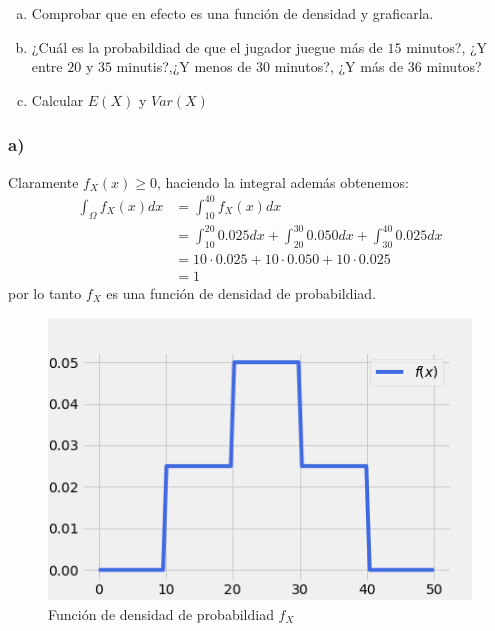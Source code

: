 \documentclass{article}
\begin{document}
\begin{enumerate}[a)]
    \item Comprobar que en efecto es una función de densidad y graficarla.
    \item ¿Cuál es la probabildiad de que el jugador juegue más de $15$ minutos?, ¿Y entre $20$ y $35$ minutis?,¿Y menos de $30$ minutos?,
    ¿Y más de $36$ minutos?
    \item Calcular $E(X)$ y $Var(X)$
\end{enumerate}
\begin{tcolorbox}[breakable]
    \subsubsection*{a)}
    Claramente $f_X(x)\geq 0$, haciendo la integral además obtenemos:
    \begin{align*}
        \int_\Omega f_X(x)dx 
        &= \int_{10}^{40} f_X(x)dx \\
        &= \int_{10}^{20} 0.025dx + \int_{20}^{30} 0.050dx + \int_{30}^{40} 0.025dx \\
        &= 10 \cdot 0.025 + 10 \cdot 0.050 + 10 \cdot 0.025 \\
        &= 1
    \end{align*}
    por lo tanto $f_X$ es una función de densidad de probabildiad.
    \begin{figure}[H]
        \centering
        \includegraphics[scale=0.7]{images/p4_density.png}
        \caption{Función de densidad de probabildiad $f_X$}
    \end{figure}

\end{tcolorbox}
\end{document}
